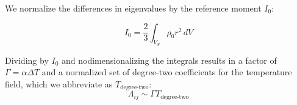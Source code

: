 \documentclass[extra,mreferee]{gji}
\newif\ifdetail
\begin{document}
We normalize the differences in eigenvalues by the reference moment $I_0$:
\ifdetail
\begin{equation}
\begin{aligned}
\int_{V_S} \rho_0 \frac{2 r^2 - Y_{20}^*}{3} &= \int_{V_S} \rho_0 (x^2 + y^2) dV = I_0 \\
\end{aligned}
\end{equation}
\begin{equation}
I_0 = \frac{2}{3} \int_{V_S} \rho_0 r^2 \left(1 - 2 \sqrt{\frac{\pi}{5}} Y_{20}\right) \,dV
\end{equation}
\fi
\begin{equation}
I_0 = \frac{2}{3} \int_{V_S} \rho_0 r^2 \,dV
\end{equation}
\ifdetail
\begin{equation}
\begin{aligned}
\Lambda_{21} &= \alpha \Delta T \frac{-6 \sqrt{\frac{\pi}{15} } \int_{V_S} T^\prime r^2  Y_{22} \,dV}{\int_{V_S} r^2 \, dV} \\
\Lambda_{31} &= \alpha \Delta T \frac{-3 \sqrt{ \frac{\pi}{15} } \int_{V_S} T^\prime r^2 \left( Y_{22} - \sqrt{3} Y_{20} \right) dV}{\int_{V_S} r^2 \, dV}\\
\Lambda_{32} &= \alpha \Delta T \frac{3 \sqrt{ \frac{\pi}{15} }  \int_{V_S}  T^\prime r^2 \left( Y_{22} + \sqrt{3} Y_{20} \right) dV}{\int_{V_S} r^2 \, dV} \\
\end{aligned}
\end{equation}
\begin{equation}
\begin{aligned}
\Lambda_{21} &= \Gamma \frac{-6 \sqrt{\frac{\pi}{15} } \int_{V_S^\prime} T^\prime {r^\prime}^2  Y_{22} \,dV^\prime}{\int_{V_S^\prime} {r^\prime}^2 \,dV^\prime} \\
\Lambda_{31} &= \Gamma \frac{-3 \sqrt{ \frac{\pi}{15} } \int_{V_S^\prime} T^\prime {r^\prime}^2 \left( Y_{22} - \sqrt{3} Y_{20} \right) dV^\prime}{\int_{V_S} {r^\prime}^2 \, dV^\prime}\\
\Lambda_{32} &= \Gamma \frac{3 \sqrt{ \frac{\pi}{15} }  \int_{V_S^\prime}  T^\prime {r^\prime}^2 \left( Y_{22} + \sqrt{3} Y_{20} \right) dV^\prime}{\int_{V_S} {r^\prime}^2 \, dV^\prime} \\
\end{aligned}
\end{equation}
\fi
Dividing by $I_0$ and nodimensionalizing the integrals results in a factor of $\Gamma = \alpha \Delta T$ and a normalized set of 
degree-two coefficients for the temperature field, which we abbreviate as $T_{\text{degree-two}}$:
\begin{equation}
\Lambda_{ij} \sim \Gamma T_{\text{degree-two}}
\end{equation}

\label{lastpage}
\end{document}
